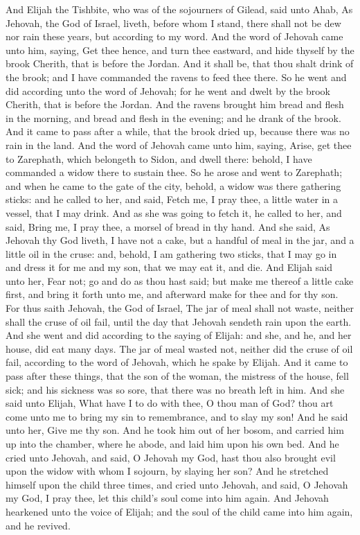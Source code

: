 And Elijah the Tishbite, who was of the sojourners of Gilead, said unto Ahab, As Jehovah, the God of Israel, liveth, before whom I stand, there shall not be dew nor rain these years, but according to my word. And the word of Jehovah came unto him, saying, Get thee hence, and turn thee eastward, and hide thyself by the brook Cherith, that is before the Jordan. And it shall be, that thou shalt drink of the brook; and I have commanded the ravens to feed thee there. So he went and did according unto the word of Jehovah; for he went and dwelt by the brook Cherith, that is before the Jordan. And the ravens brought him bread and flesh in the morning, and bread and flesh in the evening; and he drank of the brook. And it came to pass after a while, that the brook dried up, because there was no rain in the land.  And the word of Jehovah came unto him, saying, Arise, get thee to Zarephath, which belongeth to Sidon, and dwell there: behold, I have commanded a widow there to sustain thee. So he arose and went to Zarephath; and when he came to the gate of the city, behold, a widow was there gathering sticks: and he called to her, and said, Fetch me, I pray thee, a little water in a vessel, that I may drink. And as she was going to fetch it, he called to her, and said, Bring me, I pray thee, a morsel of bread in thy hand. And she said, As Jehovah thy God liveth, I have not a cake, but a handful of meal in the jar, and a little oil in the cruse: and, behold, I am gathering two sticks, that I may go in and dress it for me and my son, that we may eat it, and die. And Elijah said unto her, Fear not; go and do as thou hast said; but make me thereof a little cake first, and bring it forth unto me, and afterward make for thee and for thy son. For thus saith Jehovah, the God of Israel, The jar of meal shall not waste, neither shall the cruse of oil fail, until the day that Jehovah sendeth rain upon the earth. And she went and did according to the saying of Elijah: and she, and he, and her house, did eat many days. The jar of meal wasted not, neither did the cruse of oil fail, according to the word of Jehovah, which he spake by Elijah.  And it came to pass after these things, that the son of the woman, the mistress of the house, fell sick; and his sickness was so sore, that there was no breath left in him. And she said unto Elijah, What have I to do with thee, O thou man of God? thou art come unto me to bring my sin to remembrance, and to slay my son! And he said unto her, Give me thy son. And he took him out of her bosom, and carried him up into the chamber, where he abode, and laid him upon his own bed. And he cried unto Jehovah, and said, O Jehovah my God, hast thou also brought evil upon the widow with whom I sojourn, by slaying her son? And he stretched himself upon the child three times, and cried unto Jehovah, and said, O Jehovah my God, I pray thee, let this child’s soul come into him again. And Jehovah hearkened unto the voice of Elijah; and the soul of the child came into him again, and he revived. 